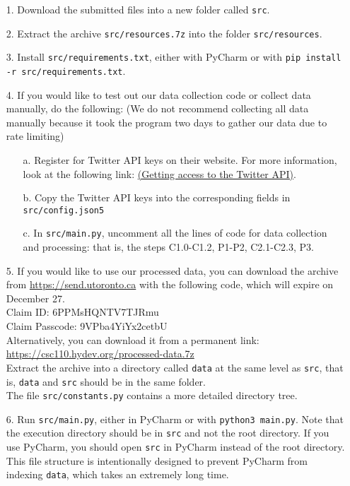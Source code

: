 \documentclass{article}
\begin{document}
    \begin{itemize}
        \item [1. ] Download the submitted files into a new folder called \verb|src|.
        
        \item [2. ] Extract the archive \verb|src/resources.7z| into the folder \verb|src/resources|.
        
        \item [3. ] Install \verb|src/requirements.txt|, either with PyCharm or with \texttt{pip install -r src/requirements.txt}.
        
        \item [4. ] If you would like to test out our data collection code or collect data manually, do the following: (We do not recommend collecting all data manually because it took the program two days to gather our data due to rate limiting)
        
        \begin{itemize}
            \item [a. ] Register for Twitter API keys on their website. For more information, look at the following link: \href{https://developer.twitter.com/en/docs/twitter-api/getting-started/getting-access-to-the-twitter-api}{(Getting access to the Twitter API)}.
            \item [b. ] Copy the Twitter API keys into the corresponding fields in \verb|src/config.json5|
            \item [c. ] In \verb|src/main.py|, uncomment all the lines of code for data collection and processing: that is, the steps C1.0-C1.2, P1-P2, C2.1-C2.3, P3.
        \end{itemize}
        
        \item [5. ] If you would like to use our processed data, you can download the archive from \url{https://send.utoronto.ca} with the following code, which will expire on December 27.\\
        Claim ID: 6PPMsHQNTV7TJRmu\\
        Claim Passcode: 9VPba4YiYx2cetbU\\
        Alternatively, you can download it from a permanent link: \url{https://csc110.hydev.org/processed-data.7z}\\
        Extract the archive into a directory called \verb|data| at the same level as \verb|src|, that is, \verb|data| and \verb|src| should be in the same folder.\\
        The file \verb|src/constants.py| contains a more detailed directory tree.
        
        \item [6. ] Run \verb|src/main.py|, either in PyCharm or with \texttt{python3 main.py}. Note that the execution directory should be in \verb|src| and not the root directory. If you use PyCharm, you should open \verb|src| in PyCharm instead of the root directory. This file structure is intentionally designed to prevent PyCharm from indexing \verb|data|, which takes an extremely long time.
        
    \end{itemize}
\end{document}
